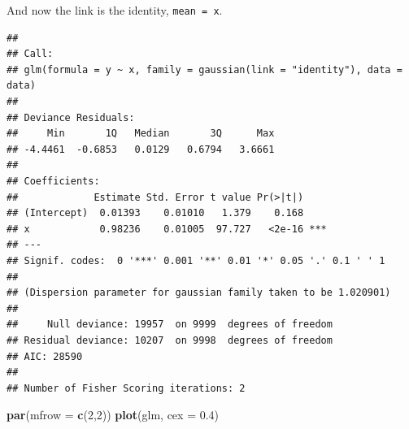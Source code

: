 \documentclass[openany]{book}
\newenvironment{Shaded}{\begin{snugshade}}{\end{snugshade}}
\newcommand{\ControlFlowTok}[1]{\textcolor[rgb]{0.13,0.29,0.53}{\textbf{#1}}}
\newcommand{\DataTypeTok}[1]{\textcolor[rgb]{0.13,0.29,0.53}{#1}}
\newcommand{\DecValTok}[1]{\textcolor[rgb]{0.00,0.00,0.81}{#1}}
\newcommand{\FloatTok}[1]{\textcolor[rgb]{0.00,0.00,0.81}{#1}}
\newcommand{\KeywordTok}[1]{\textcolor[rgb]{0.13,0.29,0.53}{\textbf{#1}}}
\newcommand{\NormalTok}[1]{#1}
\newcommand{\OperatorTok}[1]{\textcolor[rgb]{0.81,0.36,0.00}{\textbf{#1}}}
\newcommand{\StringTok}[1]{\textcolor[rgb]{0.31,0.60,0.02}{#1}}
\begin{document}
And now the link is the identity, \texttt{mean\ =\ x}.

\begin{Shaded}
\end{Shaded}

\begin{verbatim}
## 
## Call:
## glm(formula = y ~ x, family = gaussian(link = "identity"), data = data)
## 
## Deviance Residuals: 
##     Min       1Q   Median       3Q      Max  
## -4.4461  -0.6853   0.0129   0.6794   3.6661  
## 
## Coefficients:
##             Estimate Std. Error t value Pr(>|t|)    
## (Intercept)  0.01393    0.01010   1.379    0.168    
## x            0.98236    0.01005  97.727   <2e-16 ***
## ---
## Signif. codes:  0 '***' 0.001 '**' 0.01 '*' 0.05 '.' 0.1 ' ' 1
## 
## (Dispersion parameter for gaussian family taken to be 1.020901)
## 
##     Null deviance: 19957  on 9999  degrees of freedom
## Residual deviance: 10207  on 9998  degrees of freedom
## AIC: 28590
## 
## Number of Fisher Scoring iterations: 2
\end{verbatim}

\begin{Shaded}
\begin{Highlighting}[]
\KeywordTok{par}\NormalTok{(}\DataTypeTok{mfrow =} \KeywordTok{c}\NormalTok{(}\DecValTok{2}\NormalTok{,}\DecValTok{2}\NormalTok{))}
\KeywordTok{plot}\NormalTok{(glm, }\DataTypeTok{cex =} \FloatTok{0.4}\NormalTok{)}
\end{Highlighting}
\end{Shaded}
\end{document}
